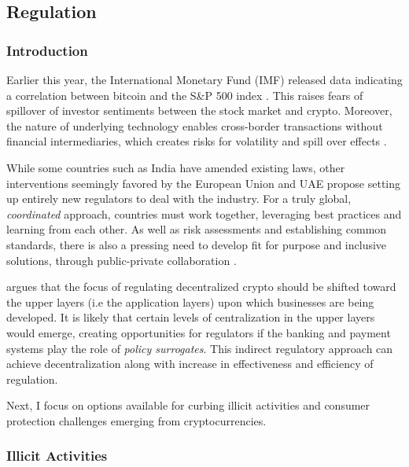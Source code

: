 \documentclass[12pt]{article}
\newcommand{\1}{\mathbbm 1}
\begin{document}
		
		
		
		\subsection{Regulation}
		
		
		\subsubsection{Introduction}
		
		Earlier this year, the International Monetary Fund (IMF) released data indicating a correlation between bitcoin and the S\&P 500 index \cite{adrian2022crypto}. This raises fears of spillover of investor sentiments between the stock market and crypto. Moreover, the nature of underlying technology enables cross-border transactions without financial intermediaries, which creates risks for volatility and spill over effects \cite{whiteWEF2022}.
		
		While some countries such as India have amended existing laws, other interventions seemingly favored by the European Union and UAE propose setting up entirely new regulators to deal with the industry. For a truly global, \textit{coordinated} approach, countries must work together, leveraging best practices and learning from each other. As well as risk assessments and establishing common standards, there is also a pressing need to develop fit for purpose and inclusive solutions, through public-private collaboration \cite{whiteWEF2022}.
		
		
		
	
		
		\cite{nabilou2019regulate} argues that the focus of regulating decentralized crypto should be shifted toward the upper layers (i.e the application layers) upon which businesses are being developed. It is likely that certain levels of centralization in the upper layers would emerge, creating opportunities for regulators if the banking and payment systems play the role of \textit{policy surrogates}. This indirect regulatory approach can achieve decentralization along with increase in effectiveness and efficiency of regulation.
		
		
		Next, I focus on options available for curbing illicit activities and consumer protection challenges emerging from cryptocurrencies.
		
		
	
	\subsubsection{Illicit Activities}
	
\end{document}
